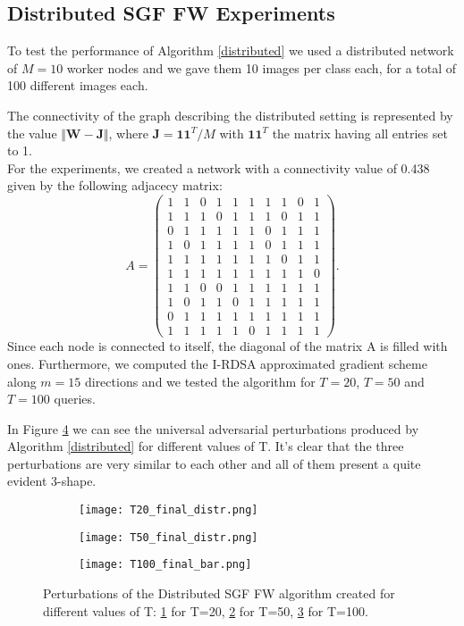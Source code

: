 \subsection{Distributed SGF FW Experiments}
To test the performance of Algorithm \ref{distributed} we used a distributed network of $M=10$ worker nodes and we
gave them 10 images per class each, for a total of 100 different images each.

The connectivity of the graph describing the distributed setting is represented by the value $\Vert \mathbf{W}- \mathbf{J} \Vert$,
where $\mathbf{J}= \mathbf{11}^T/M$ with $\mathbf{11}^T$ the matrix having all entries set to 1.\\ For the experiments, we created a network
with a connectivity value of 0.438 given by the following adjacecy
matrix:
\[ A =
\begin{pmatrix}
1& 1& 0& 1& 1& 1& 1& 1& 0& 1\\
1& 1& 1& 0& 1& 1& 1& 0& 1& 1\\
0& 1& 1& 1& 1& 1& 0& 1& 1& 1\\
1& 0& 1& 1& 1& 1& 0& 1& 1& 1\\
1& 1& 1& 1& 1& 1& 1& 0& 1& 1\\
1& 1& 1& 1& 1& 1& 1& 1& 1& 0\\
1& 1& 0& 0& 1& 1& 1& 1& 1& 1\\
1& 0& 1& 1& 0& 1& 1& 1& 1& 1\\
0& 1& 1& 1& 1& 1& 1& 1& 1& 1\\
1& 1& 1& 1& 1& 0& 1& 1& 1& 1
\end{pmatrix}
.\]
Since each node is connected to itself, the diagonal of the matrix A is filled with ones.
Furthermore, we computed the I-RDSA approximated gradient scheme along $m=15$ directions and we tested the algorithm for $T=20$, $T=50$ and $T=100$ queries.

In Figure \ref{fig:perturbations} we can see the universal adversarial perturbations produced by Algorithm \ref{distributed}
for different values of T. It's clear that the three perturbations are very similar to each other and all of them present a quite evident 3-shape.
\begin{figure}[h]
	\centering
	\begin{subfigure}[b]{0.15\textwidth}
		\centering
		\texttt{[image: T20\_final\_distr.png]}
		\caption{}
		\label{fig:distributed_perturbation_20}
	\end{subfigure}
	\hfill
	\begin{subfigure}[b]{0.15\textwidth}
		\texttt{[image: T50\_final\_distr.png]}
		\caption{}
		\label{fig:variance-distributed_perturbation_50}
	\end{subfigure}
	\hfill
	\begin{subfigure}[b]{0.15\textwidth}
		\texttt{[image: T100\_final\_bar.png]}
		\caption{}
		\label{fig:distributed_perturbation_100}
	\end{subfigure}
	\caption{{\small Perturbations of the Distributed SGF FW algorithm created for different values of T:
	  \ref{fig:distributed_perturbation_20} for T=20, \ref{fig:variance-distributed_perturbation_50} for T=50, \ref{fig:distributed_perturbation_100} for T=100.}}
	\label{fig:perturbations}
\end{figure}


